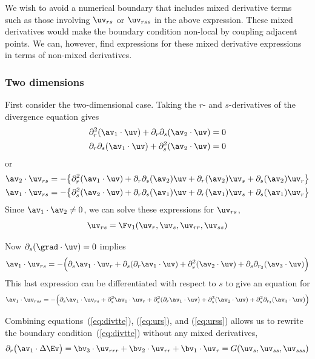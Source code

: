 \documentclass[10pt]{article}
\begin{document}
We wish to avoid a numerical boundary that includes mixed derivative terms such as those involving
$\uv_{rs}$ or $\uv_{rss}$ in the above expression. These mixed derivatives would make the 
boundary condition non-local by coupling adjacent points. We can, however, find expressions
for these mixed derivative expressions in terms of non-mixed derivatives.

\subsubsection{Two dimensions}

First consider the two-dimensional case.
Taking the $r$- and $s$-derivatives of the divergence equation gives
\begin{align*}
   \partial_r^2(\av_1\cdot\uv) + \partial_r\partial_s(\av_2\cdot\uv) &=0 \\
   \partial_r\partial_s(\av_1\cdot\uv) + \partial_s^2(\av_2\cdot\uv) &=0
\end{align*}
or
\begin{align*}
 \av_2\cdot\uv_{rs} &= -\big\{ \partial_r^2(\av_1\cdot\uv) + \partial_r\partial_s(\av_2)\uv 
                  + \partial_r(\av_2)\uv_s + \partial_s(\av_2)\uv_r\big\}   \\
 \av_1\cdot\uv_{rs} &= -\big\{ \partial_s^2(\av_2\cdot\uv) + \partial_r\partial_s(\av_1)\uv 
                     + \partial_r(\av_1)\uv_s + \partial_s(\av_1)\uv_r  \big\} 
\end{align*}
Since $\av_1\cdot\av_2\ne 0$, we can solve these expressions for $\uv_{rs}$,
\begin{equation}
   \uv_{rs} = \Fv_1(\uv_r,\uv_s,\uv_{rr},\uv_{ss})  \label{eq:urs}
\end{equation}

Now $\partial_s(\grad\cdot\uv)=0$ implies
\[
   \av_1 \cdot \uv_{rs} = -\Big( \partial_s\av_1\cdot\uv_r +
       \partial_s( \partial_r\av_1\cdot\uv) + \partial_s^2(\av_2\cdot\uv)+ \partial_s\prc(\av_3\cdot\uv) \Big)
\]
This last expression can be differentiated with respect to $s$ to give an equation
for 
\begin{equation}
\av_1 \cdot \uv_{rss} =  -\Big( \partial_s\av_1\cdot\uv_{rs} + \partial_s^2\av_1\cdot\uv_{r} +
       \partial_s^2( \partial_r\av_1\cdot\uv) + \partial_s^3(\av_2\cdot\uv)
           + \partial_s^2\prc(\av_3\cdot\uv) \Big)  \label{eq:urss}
\end{equation}

Combining equations~(\ref{eq:divtte}), (\ref{eq:urs}), and (\ref{eq:urss}) allows us to rewrite
the boundary condition~(\ref{eq:divtte}) without any mixed derivatives,
\begin{equation}
  \partial_r\big(\av_1\cdot \Delta\Ev \big) =
    \bv_3\cdot\uv_{rrr} + \bv_2\cdot\uv_{rr} + \bv_1\cdot\uv_{r} = G(\uv_s,\uv_{ss},\uv_{sss})
\end{equation}
\end{document}
